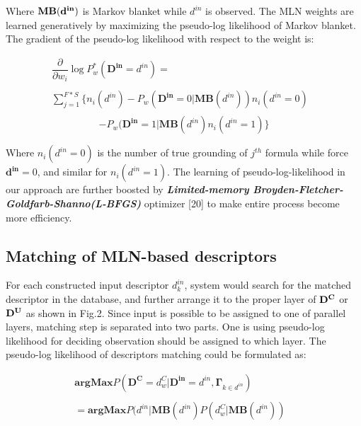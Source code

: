 \documentclass[journal]{IEEEtran}
\begin{document}
Where $\bf{MB}(d^{in})$ is Markov blanket while $d^{in}$ is observed. The MLN weights are learned generatively by maximizing the pseudo-log likelihood of Markov blanket. The gradient of the pseudo-log likelihood with respect to the weight is:

\begin{displaymath}
\begin{array}{ll}
\dfrac{\partial}{\partial w_i}\log P^*_w(\mathbf{D^{in}} = d^{in})= &\\\\
\sum^{F*S}_{j=1}\{n_i(d^{in})-P_w(\mathbf{D^{in}}=0|\mathbf{MB}(d^{in}))n_i(d^{in}=0) &\\
\end{array}
\end{displaymath}
\begin{equation}
-P_w(\mathbf{D^{in}}=1|\mathbf{MB}(d^{in})n_i(d^{in}=1)\}
\end{equation}

Where $n_i(d^{in}=0)$ is the number of true grounding of $j^{th}$ formula while force $\mathbf{d^{in}}=0$, and similar for $n_i(d^{in}=1)$. The learning of pseudo-log-likelihood in our approach are further boosted by  \textbf{\textit{Limited-memory Broyden-Fletcher-Goldfarb-Shanno(L-BFGS)}} optimizer [20] to make entire process become more efficiency.

\subsection{Matching of MLN-based descriptors}
For each constructed input descriptor $d^{in}_k$, system would search for the matched descriptor in the database, and further arrange it to the proper layer of $\bf{D^C}$ or $\bf{D^U}$ as shown in Fig.2. Since input is possible to be assigned to one of parallel layers, matching step is separated into two parts. One is using pseudo-log likelihood for deciding observation should be assigned to which layer. The pseudo-log likelihood of descriptors matching could be formulated as:


\begin{equation}
\begin{array}{ll}

\mathbf{argMax}P(\mathbf{D^C} = d^C_w  | \mathbf{D^{in}} = d^{in} , \mathbf{\Gamma}_{k \in {d^{in}}}) &\\\\
= \mathbf{argMax}P(d^{in} | \mathbf{MB}(d^{in}){P(d^{C}_w | \mathbf{MB}(d^{in}))}
\end{array}
\end{equation}
\end{document}
